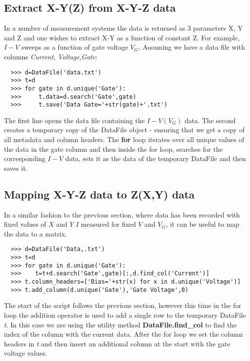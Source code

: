 \documentclass[a4paper,11pt]{scrartcl}
\begin{document}
\subsection{Extract X-Y(Z) from X-Y-Z data}

In a number of measurement systems the data is returned as 3 parameters X, Y and Z and one wishes to extract X-Y as a function of constant Z. For example, $I-V$ sweeps as a function of gate voltage $V_G$. Assuming we have a data file with columns \textit{Current}, \textit{Voltage},\textit{Gate}:

\begin{verbatim}
  >>> d=DataFile('data.txt')
  >>> t=d
  >>> for gate in d.unique('Gate'):
  >>>     t.data=d.search('Gate',gate)
  >>>     t.save('Data Gate='+str(gate)+'.txt')
\end{verbatim}

The first line opens the data file containing the $I-V(V_G)$ data. The second creates a temporary copy of the DataFile object - ensuring that we get a copy of all metadata and column headers. The \textbf{for} loop iterates over all unique values of the data in the gate column and then inside the for loop, searches for the corresponding $I-V$ data, sets it as the data of the temporary DataFile and then saves it.

\subsection{Mapping X-Y-Z data to Z(X,Y) data}

In a similar fashion to the previous section, where data has been recorded with fixed values of $X$ and $Y$ \eg $I$ measured for fixed $V$ and $V_G$, it can be useful to map the data to a matrix.

\begin{verbatim}
  >>> d=DataFile('Data,.txt')
  >>> t=d
  >>> for gate in d.unique('Gate'):
  >>>    t=t+d.search('Gate',gate)[:,d.find_col('Current')]
  >>> t.column_headers=['Bias='+str(x) for x in d.unique('Voltage')]
  >>> t.add_column(d.unique('Gate'),'Gate Voltage',0)
\end{verbatim}

The start of the script follows the previous section, however this time in the for loop the addition operator is used to add a single row to the temporary DataFile \textit{t}. In this case we are using the utility method \textbf{DataFile.find\_col} to find the index of the column with the current data. After the for loop we set the column headers in \textit{t} and then insert an additional column at the start with the gate voltage values.
\end{document}
